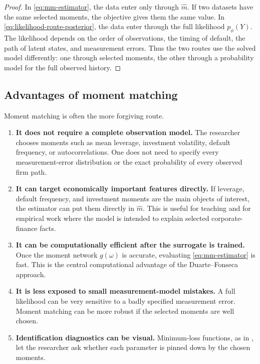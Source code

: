 \documentclass[11pt]{article}
\newcommand{\1}{\mathbf{1}}
\begin{document}
\begin{proof}
In \cref{eq:mm-estimator}, the data enter only through \(\widehat m\). If two
datasets have the same selected moments, the objective gives them the same
value. In \cref{eq:likelihood-route-posterior}, the data enter through the full
likelihood \(p_\phi(Y)\). The likelihood depends on the order of observations,
the timing of default, the path of latent states, and measurement errors. Thus
the two routes use the solved model differently: one through selected moments,
the other through a probability model for the full observed history.
\end{proof}

\subsection{Advantages of moment matching}

Moment matching is often the more forgiving route.

\begin{enumerate}[leftmargin=2em]
  \item \textbf{It does not require a complete observation model.} The
  researcher chooses moments such as mean leverage, investment volatility,
  default frequency, or autocorrelations. One does not need to specify every
  measurement-error distribution or the exact probability of every observed
  firm path.

  \item \textbf{It can target economically important features directly.} If
  leverage, default frequency, and investment moments are the main objects of
  interest, the estimator can put them directly in \(\widehat m\). This is
  useful for teaching and for empirical work where the model is intended to
  explain selected corporate-finance facts.

  \item \textbf{It can be computationally efficient after the surrogate is
  trained.} Once the moment network \(g(\omega)\) is accurate, evaluating
  \cref{eq:mm-estimator} is fast. This is the central computational advantage
  of the Duarte--Fonseca approach.

  \item \textbf{It is less exposed to small measurement-model mistakes.} A
  full likelihood can be very sensitive to a badly specified measurement error.
  Moment matching can be more robust if the selected moments are well chosen.

  \item \textbf{Identification diagnostics can be visual.} Minimum-loss
  functions, as in \citet[Sections 3.5--3.6]{duartefonseca2026ai}, let the
  researcher ask whether each parameter is pinned down by the chosen moments.
\end{enumerate}
\end{document}
